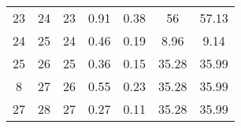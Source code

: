 \begin{table}[]
\begin{tabular}{@{}ccccccc@{}}
23                                                           & 24                                                             & 23                                                    & 0.91                                                                           & 0.38                                                                           & 56                                                                                  & 57.13                                                                                 \\
24                                                           & 25                                                             & 24                                                    & 0.46                                                                           & 0.19                                                                           & 8.96                                                                                & 9.14                                                                                  \\
25                                                           & 26                                                             & 25                                                    & 0.36                                                                           & 0.15                                                                           & 35.28                                                                               & 35.99                                                                                 \\
8                                                            & 27                                                             & 26                                                    & 0.55                                                                           & 0.23                                                                           & 35.28                                                                               & 35.99                                                                                 \\
27                                                           & 28                                                             & 27                                                    & 0.27                                                                           & 0.11                                                                           & 35.28                                                                               & 35.99                                                                                 \\ \bottomrule
\end{tabular}
\end{table}

